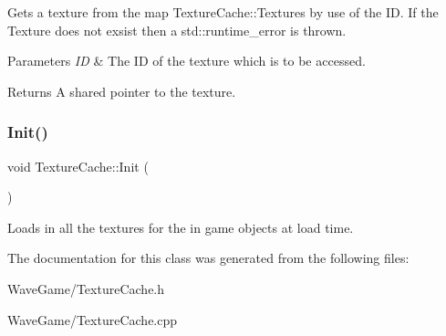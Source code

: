 Gets a texture from the map Texture\+Cache\+::\+Textures by use of the ID. If the Texture does not exsist then a std\+::runtime\+\_\+error is thrown. 


\begin{DoxyParams}{Parameters}
{\em ID} & The ID of the texture which is to be accessed.\\
\hline
\end{DoxyParams}
\begin{DoxyReturn}{Returns}
A shared pointer to the texture.
\end{DoxyReturn}
\mbox{\label{class_texture_cache_a60e9f696d701a6f62418ae8fc6c4b2c0}} 
\subsubsection{\texorpdfstring{Init()}{Init()}}
{\footnotesize\ttfamily void Texture\+Cache\+::\+Init (\begin{DoxyParamCaption}{ }\end{DoxyParamCaption})\hspace{0.3cm}{\ttfamily [static]}}



Loads in all the textures for the in game objects at load time. 



The documentation for this class was generated from the following files\+:\begin{DoxyCompactItemize}
\item 
Wave\+Game/Texture\+Cache.\+h\item 
Wave\+Game/Texture\+Cache.\+cpp\end{DoxyCompactItemize}
